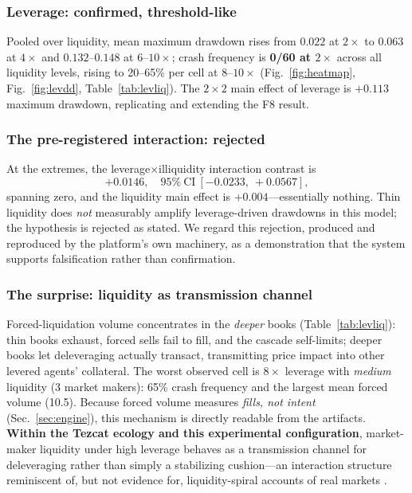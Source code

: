 \documentclass[conference]{IEEEtran}
\newcommand{\tez}{Tezcat}
\begin{document}
\subsubsection{Leverage: confirmed, threshold-like}
Pooled over liquidity, mean maximum drawdown rises from $0.022$ at
$2\times$ to $0.063$ at $4\times$ and $0.132$--$0.148$ at
$6$--$10\times$; crash frequency is \textbf{0/60 at $2\times$} across
all liquidity levels, rising to 20--65\% per cell at $8$--$10\times$
(Fig.~\ref{fig:heatmap}, Fig.~\ref{fig:levdd},
Table~\ref{tab:levliq}). The $2{\times}2$ main effect of leverage is
$+0.113$ maximum drawdown, replicating and extending the F8 result.

\subsubsection{The pre-registered interaction: rejected}
At the extremes, the leverage$\times$illiquidity interaction contrast
is
\begin{equation*}
+0.0146,\quad 95\%\ \mathrm{CI}\ [-0.0233,\ +0.0567],
\end{equation*}
spanning zero, and the liquidity main effect is $+0.004$---essentially
nothing. Thin liquidity does \emph{not} measurably amplify
leverage-driven drawdowns in this model; the hypothesis is rejected as
stated. We regard this rejection, produced and reproduced by the
platform's own machinery, as a demonstration that the system supports
falsification rather than confirmation.

\subsubsection{The surprise: liquidity as transmission channel}
Forced-liquidation volume concentrates in the \emph{deeper} books
(Table~\ref{tab:levliq}): thin books exhaust, forced sells fail to
fill, and the cascade self-limits; deeper books let deleveraging
actually transact, transmitting price impact into other levered
agents' collateral. The worst observed cell is $8\times$ leverage with
\emph{medium} liquidity (3 market makers): 65\% crash frequency and
the largest mean forced volume (10.5). Because forced volume measures
\emph{fills, not intent} (Sec.~\ref{sec:engine}), this mechanism is
directly readable from the artifacts. \textbf{Within the \tez{}
ecology and this experimental configuration}, market-maker liquidity
under high leverage behaves as a transmission channel for deleveraging
rather than simply a stabilizing cushion---an interaction structure
reminiscent of, but not evidence for, liquidity-spiral accounts of
real markets \cite{brunnermeier2009,shleifer2011}.
\end{document}

